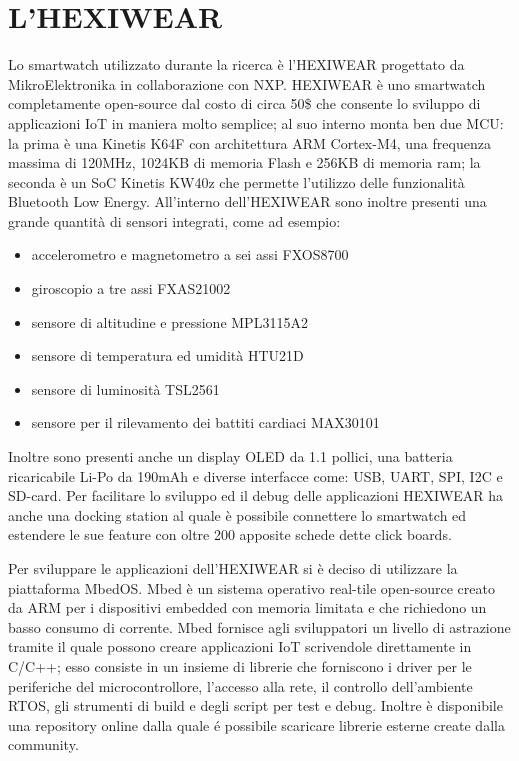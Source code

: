 \section{L'HEXIWEAR}

Lo smartwatch utilizzato durante la ricerca è l’HEXIWEAR progettato da MikroElektronika in collaborazione con NXP. HEXIWEAR è uno smartwatch completamente open-source dal costo di circa 50\$ che consente lo sviluppo di applicazioni IoT in maniera molto semplice; al suo interno monta ben due MCU: la prima è una Kinetis K64F con architettura ARM Cortex-M4, una frequenza massima di 120MHz, 1024KB di memoria Flash e 256KB di memoria ram; la seconda è un SoC Kinetis KW40z che permette l’utilizzo delle funzionalità Bluetooth Low Energy. 
All'interno dell'HEXIWEAR sono inoltre presenti una grande quantità di sensori integrati, come ad esempio: 

\begin{itemize}
    \item accelerometro e magnetometro a sei assi FXOS8700
    \item giroscopio a tre assi FXAS21002
    \item sensore di altitudine e pressione MPL3115A2
    \item sensore di temperatura ed umidità HTU21D
    \item sensore di luminosità TSL2561
    \item sensore per il rilevamento dei battiti cardiaci MAX30101
\end{itemize}

Inoltre sono presenti anche un display OLED da 1.1 pollici, una batteria ricaricabile Li-Po da 190mAh e diverse interfacce come: USB, UART, SPI, I2C e SD-card.
Per facilitare lo sviluppo ed il debug delle applicazioni HEXIWEAR ha anche una docking station al quale è possibile connettere lo smartwatch ed estendere le sue feature con oltre 200 apposite schede dette click boards.

Per sviluppare le applicazioni dell'HEXIWEAR si è deciso di utilizzare la piattaforma MbedOS. Mbed è un sistema operativo real-tile open-source creato da ARM per i dispositivi embedded con memoria limitata e che richiedono un basso consumo di corrente. 
Mbed fornisce agli sviluppatori un livello di astrazione tramite il quale possono creare applicazioni IoT scrivendole direttamente in C/C++; esso consiste in un insieme di librerie che forniscono i driver per le periferiche del microcontrollore, l'accesso alla rete, il controllo dell'ambiente RTOS, gli strumenti di build e degli script per test e debug. 
Inoltre è disponibile una repository online dalla quale é possibile scaricare librerie esterne create dalla community.

